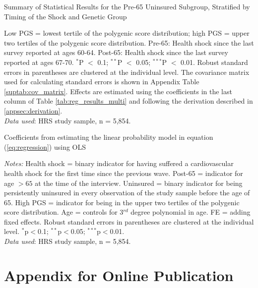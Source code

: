 \documentclass[11pt]{article}
\begin{document}
\begin{table}[!ht]
	\caption{Summary of Statistical Results for the Pre-65 Uninsured Subgroup, Stratified by Timing of the Shock and Genetic Group}
	\label{tab:main_effects}
	
		\begin{flushleft}
			Low PGS = lowest tertile of the polygenic score distribution; high PGS = upper two tertiles of the polygenic score distribution.
			Pre-65: Health shock since the last survey reported at ages 60-64.
			Post-65: Health shock since the last survey reported at ages 67-70.
			$^{*}$P $<$ 0.1; $^{**}$P $<$ 0.05; $^{***}$P $<$ 0.01. Robust standard errors in parentheses are clustered at the individual level.
			The covariance matrix used for calculating standard errors is shown in Appendix Table \ref{suptab:cov_matrix}.
			Effects are estimated using the coefficients in the last column of Table \ref{tab:reg_results_multi} and following the derivation described in \ref{appsec:derivation}.\\
			\textit{Data used}: HRS study sample, n = 5,854.
		\end{flushleft}
\end{table}



\begin{table}[!ht] \centering
	\caption{Coefficients from estimating the linear probability model in equation (\ref{eq:regression}) using OLS\vspace{-0.4cm}}
	\addtolength{\tabcolsep}{-7pt}
	\label{tab:reg_results_multi}
	\resizebox{0.55\textheight}{!}{
	
	} %
	\begin{flushleft}
	\textit{Notes:}
	Health shock = binary indicator for having suffered a cardiovascular health shock for the first time since the previous wave.
	Post-65 = indicator for age $> 65$ at the time of the interview.
	Uninsured = binary indicator for being persistently uninsured in every observation of the study sample before the age of 65.
	High PGS = indicator for being in the upper two tertiles of the polygenic score distribution.
    Age = controls for 3$^{rd}$ degree polynomial in age.
    FE = adding fixed effects.
	Robust standard errors in parentheses are clustered at the individual level.
	$^{*}$p$<$0.1; $^{**}$p$<$0.05; $^{***}$p$<$0.01.
	\\ \textit{Data used}: HRS study sample, n = 5,854.
	\end{flushleft}
\end{table}


\clearpage
\newpage

\appendix

\section{Appendix for Online Publication}



\end{document}
